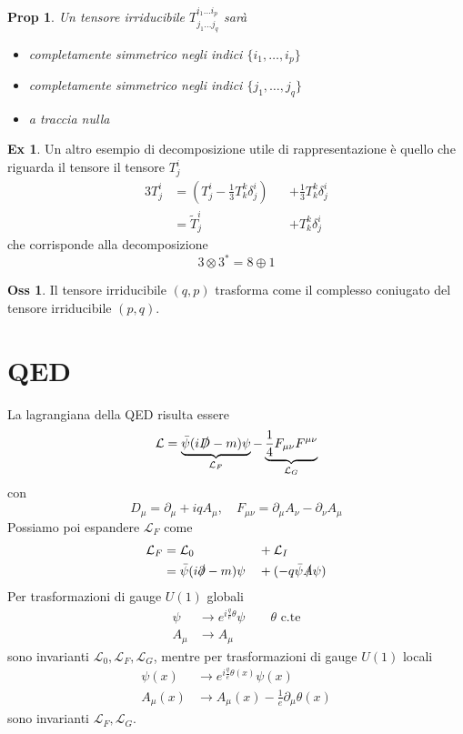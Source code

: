 \documentclass[10pt,a4paper]{article}
\newtheorem{prop}{Prop}[section]
\theoremstyle{definition}
\newtheorem{observation}{Oss}[section]
\newtheorem{example}{Ex}[section]
\newcommand{\lagr}{\mathcal{L}} %
\begin{document}
\begin{prop}
    Un tensore irriducibile $T_{j_1 \dots j_q}^{i_1 \dots i_p}$ sarà
    \begin{itemize}
        \item completamente simmetrico negli indici $\{i_1, \dots, i_p\}$
        \item completamente simmetrico negli indici $\{j_1, \dots, j_q\}$
        \item a traccia nulla
    \end{itemize}
\end{prop}

\begin{example}
    Un altro esempio di decomposizione utile di rappresentazione è quello che riguarda il tensore il tensore $T_j^i$
    \begin{alignat*}{3}
        T^i_j &= (T^i_j - \frac13 T_k^k \delta^i_j) &&+ \frac13 T_k^k \delta^i_j \\
        &= \tilde{T}^i_j &&+ T_k^k \delta^i_j 
    \end{alignat*}
    che corrisponde alla decomposizione 
    \[
    3 \otimes 3^* = 8 \oplus 1    
    \]
\end{example}

\begin{observation}
    Il tensore irriducibile $(q, p)$ trasforma come il complesso coniugato del tensore irriducibile $(p, q)$.
\end{observation}


\section{QED}
La lagrangiana della QED risulta essere
\[
    \lagr = \underbrace{\bar{\psi}(i\slashed{D}- m)\psi}_{\lagr_F} - \underbrace{\frac14 F_{\mu \nu}F^{\mu \nu}}_{\lagr_G}
\]
con
\[
D_\mu = \partial_\mu + iqA_\mu, \quad F_{\mu \nu} = \partial_\mu A_\nu - \partial_\nu A_\mu    
\]
Possiamo poi espandere $\lagr_F$ come
\begin{alignat*}{3}
    \lagr_F &= \lagr_0 &&+ \lagr_I \\
    &= \bar{\psi}(i\slashed{\partial}-m)\psi &&+ (-q\bar{\psi}\slashed{A}\psi)
\end{alignat*}
Per trasformazioni di gauge $U(1)$ globali
\begin{align*}
    \psi &\to e^{i\frac{q}{e}\theta}\psi \qquad \theta \text{ c.te} \\
    A_\mu &\to A_\mu
\end{align*}
sono invarianti $\lagr_0, \lagr_F, \lagr_G$, mentre per trasformazioni di gauge $U(1)$ locali
\begin{align*}
    \psi(x) &\to e^{i\frac{q}{e}\theta(x)}\psi(x)\\
    A_\mu(x) &\to A_\mu(x) - \frac{1}{e}\partial_\mu\theta(x)
\end{align*}
sono invarianti $\lagr_F, \lagr_G$.
\end{document}
